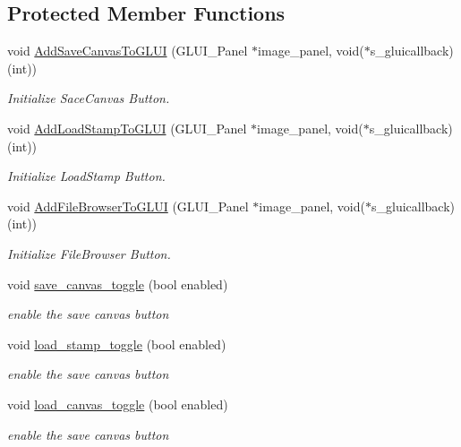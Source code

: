 \subsection*{Protected Member Functions}
\begin{DoxyCompactItemize}
\item 
void \hyperlink{classimage__tools_1_1IOManager_a600cf7d9a1b1a86cbb2201fc7ec7b528}{Add\+Save\+Canvas\+To\+G\+L\+UI} (G\+L\+U\+I\+\_\+\+Panel $\ast$image\+\_\+panel, void($\ast$s\+\_\+gluicallback)(int))
\begin{DoxyCompactList}\small\item\em Initialize Sace\+Canvas Button. \end{DoxyCompactList}\item 
void \hyperlink{classimage__tools_1_1IOManager_a39e6a658f7d97741e09c1cec9ad08396}{Add\+Load\+Stamp\+To\+G\+L\+UI} (G\+L\+U\+I\+\_\+\+Panel $\ast$image\+\_\+panel, void($\ast$s\+\_\+gluicallback)(int))
\begin{DoxyCompactList}\small\item\em Initialize Load\+Stamp Button. \end{DoxyCompactList}\item 
void \hyperlink{classimage__tools_1_1IOManager_a078d05c79a2a954c38050aa4f4985768}{Add\+File\+Browser\+To\+G\+L\+UI} (G\+L\+U\+I\+\_\+\+Panel $\ast$image\+\_\+panel, void($\ast$s\+\_\+gluicallback)(int))
\begin{DoxyCompactList}\small\item\em Initialize File\+Browser Button. \end{DoxyCompactList}\item 
void \hyperlink{classimage__tools_1_1IOManager_abeb5355f6d3e08847d715dc910a2236b}{save\+\_\+canvas\+\_\+toggle} (bool enabled)
\begin{DoxyCompactList}\small\item\em enable the save canvas button \end{DoxyCompactList}\item 
void \hyperlink{classimage__tools_1_1IOManager_a6d8268c033e7aee661d3a3d7ae39f13d}{load\+\_\+stamp\+\_\+toggle} (bool enabled)
\begin{DoxyCompactList}\small\item\em enable the save canvas button \end{DoxyCompactList}\item 
void \hyperlink{classimage__tools_1_1IOManager_acefb393df8796d8d2f68a0aa7a67a1eb}{load\+\_\+canvas\+\_\+toggle} (bool enabled)
\begin{DoxyCompactList}\small\item\em enable the save canvas button \end{DoxyCompactList}\item 

\end{DoxyCompactItemize}
